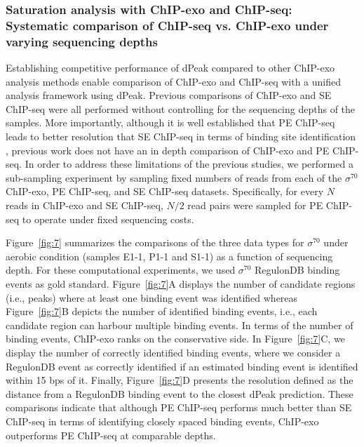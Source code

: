 \documentclass{bmcart}
\newcommand{\sig}{\sigma^{70}}
\begin{document}
\subsubsection*{Saturation analysis with ChIP-exo and ChIP-seq: Systematic comparison of ChIP-seq vs. ChIP-exo under
  varying sequencing depths}
Establishing competitive performance of dPeak compared to other
ChIP-exo analysis methods enable comparison of ChIP-exo and ChIP-seq
with a unified analysis framework using dPeak. Previous comparisons of
ChIP-exo and SE ChIP-seq were all performed without controlling for
the sequencing depths of the samples. More importantly, although it is
well established that PE ChIP-seq leads to better resolution that SE
ChIP-seq in terms of binding site identification \cite{zhang16},
previous work does not have an in depth comparison of ChIP-exo and PE
ChIP-seq.
In order to address these limitations of the previous studies, we
performed a sub-sampling experiment by sampling fixed numbers of reads
from each of the $\sig$ ChIP-exo, PE ChIP-seq, and SE ChIP-seq
datasets. Specifically, for every $N$ reads in ChIP-exo and SE
ChIP-seq, $N/2$ read pairs were sampled for PE ChIP-seq to operate
under fixed sequencing costs.

Figure~\ref{fig:7} summarizes the comparisons of the three data
types for $\sig$ under aerobic condition (samples E1-1, P1-1 and S1-1)
as a function of sequencing depth. For these computational
experiments, we used $\sig$ RegulonDB \cite{regulondb} binding events
as gold standard.  Figure~\ref{fig:7}A displays the number of
candidate regions (i.e., peaks) where at least one binding event was
identified whereas Figure~\ref{fig:7}B depicts the number of
identified binding events, i.e., each candidate region can harbour
multiple binding events.  In terms of the number of binding events,
ChIP-exo ranks on the conservative side.  In Figure~\ref{fig:7}C,
we display the number of correctly identified binding events, where we
consider a RegulonDB event as correctly identified if an estimated
binding event is identified within 15 bps of it. Finally,
Figure~\ref{fig:7}D presents the resolution defined as the
distance from a RegulonDB binding event to the closest dPeak
prediction. These comparisons indicate that although PE ChIP-seq
performs much better than SE ChIP-seq in terms of identifying closely
spaced binding events, ChIP-exo outperforms PE ChIP-seq at comparable
depths.
\end{document}
